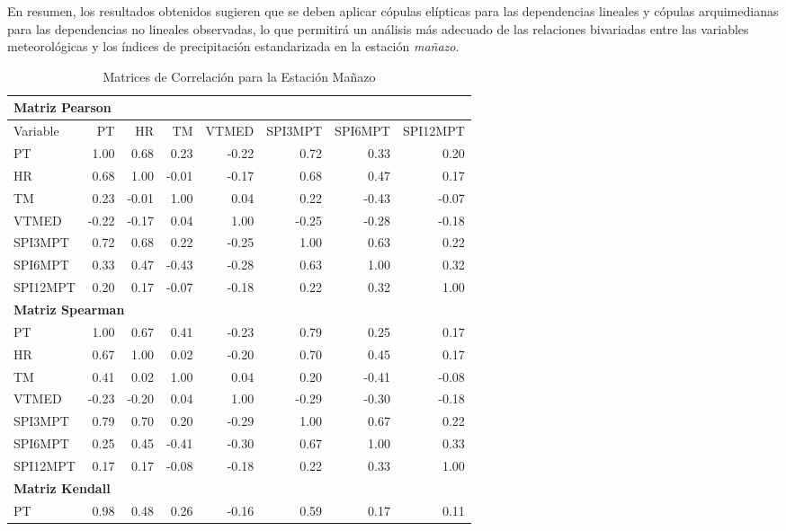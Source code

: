 En resumen, los resultados obtenidos sugieren que se deben aplicar cópulas elípticas para las dependencias lineales y cópulas arquimedianas para las dependencias no lineales observadas, lo que permitirá un análisis más adecuado de las relaciones bivariadas entre las variables meteorológicas y los índices de precipitación estandarizada en la estación \textit{mañazo}.



\begin{table}[ht]
\centering
\caption{Matrices de Correlación para la Estación Mañazo}
\begin{tabular}{lrrrrrrr}
\toprule
\multicolumn{8}{l}{\textbf{Matriz Pearson}} \\
\midrule
Variable & PT & HR & TM & VTMED & SPI3MPT & SPI6MPT & SPI12MPT \\
\midrule
PT       & 1.00 & 0.68 & 0.23 & -0.22 & 0.72 & 0.33 & 0.20 \\
HR       & 0.68 & 1.00 & -0.01 & -0.17 & 0.68 & 0.47 & 0.17 \\
TM       & 0.23 & -0.01 & 1.00 & 0.04 & 0.22 & -0.43 & -0.07 \\
VTMED    & -0.22 & -0.17 & 0.04 & 1.00 & -0.25 & -0.28 & -0.18 \\
SPI3MPT  & 0.72 & 0.68 & 0.22 & -0.25 & 1.00 & 0.63 & 0.22 \\
SPI6MPT  & 0.33 & 0.47 & -0.43 & -0.28 & 0.63 & 1.00 & 0.32 \\
SPI12MPT & 0.20 & 0.17 & -0.07 & -0.18 & 0.22 & 0.32 & 1.00 \\
\midrule
\multicolumn{8}{l}{\textbf{Matriz Spearman}} \\
\midrule
PT       & 1.00 & 0.67 & 0.41 & -0.23 & 0.79 & 0.25 & 0.17 \\
HR       & 0.67 & 1.00 & 0.02 & -0.20 & 0.70 & 0.45 & 0.17 \\
TM       & 0.41 & 0.02 & 1.00 & 0.04 & 0.20 & -0.41 & -0.08 \\
VTMED    & -0.23 & -0.20 & 0.04 & 1.00 & -0.29 & -0.30 & -0.18 \\
SPI3MPT  & 0.79 & 0.70 & 0.20 & -0.29 & 1.00 & 0.67 & 0.22 \\
SPI6MPT  & 0.25 & 0.45 & -0.41 & -0.30 & 0.67 & 1.00 & 0.33 \\
SPI12MPT & 0.17 & 0.17 & -0.08 & -0.18 & 0.22 & 0.33 & 1.00 \\
\midrule
\multicolumn{8}{l}{\textbf{Matriz Kendall}} \\
\midrule
PT       & 0.98 & 0.48 & 0.26 & -0.16 & 0.59 & 0.17 & 0.11 \\

\end{tabular}
\end{table}
